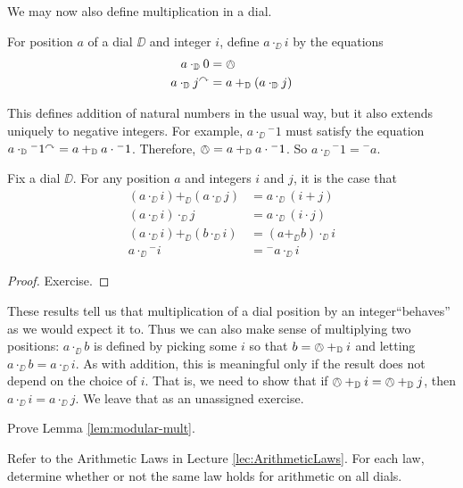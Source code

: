 We may now also define multiplication in a dial.

\begin{defn}
	For position $a$ of a dial $\DD$ and integer $i$, define $a\cdot_\DD i$ by the equations
	\begin{align*}
		a\cdot_{\mathbb D}  0 &= \owedge\\
		a\cdot_{\mathbb D} j^\curvearrowright &= a +_{\mathbb D} (a\cdot_{\mathbb D} j)
	\end{align*}
	
	This defines addition of natural numbers in the usual way, but it also extends uniquely to negative integers. For example, $a \cdot_\DD {}^-1$ must satisfy the equation $a\cdot_{\mathbb D} {}^-1^\curvearrowright = a +_{\mathbb D} a\cdot {}^-1$.
	Therefore, $\owedge = a +_{\mathbb D} a\cdot {}^-1$. So $a\cdot_\DD {}^-1 = {}^- a$.
\end{defn}


\begin{lem}\label{lem:modular-mult}
	Fix a dial $\DD$. For any position $a$ and integers $i$ and $j$, it is the case that 
	\begin{align*} 
		(a \cdot_\DD i)+_\DD (a\cdot_\DD j) &= a\cdot_\DD (i+j)\\
		(a\cdot_\DD i)\cdot_\DD j &= a\cdot_\DD (i\cdot j)\\
		(a\cdot_\DD i) +_\DD (b\cdot_\DD i) &= (a+_\DD b)\cdot_\DD i\\
		a\cdot_\DD{}^-i &= {}^-a \cdot_\DD i
	\end{align*}

\begin{proof}
	Exercise.
\end{proof}
\end{lem}

These results tell us that multiplication of a dial position by an integer``behaves'' as we would expect it to. Thus we can also make sense of multiplying two positions: $a \cdot_\DD b$ is defined by picking some $i$ so that $b = \owedge +_{\mathbb D} i$ and letting $a\cdot_\DD b = a\cdot_\DD i$. As with addition, this is meaningful only if the result does not depend on the choice of $i$. That is, we need to show that if $\owedge +_{\mathbb D} i = \owedge +_{\mathbb D} j$, then $a\cdot_\DD i = a\cdot_\DD j$. We leave that as an unassigned exercise.

\begin{exer}
	\begin{exercise}
		\item Prove Lemma \ref{lem:modular-mult}.
		\item Refer to the Arithmetic Laws in Lecture \ref{lec:ArithmeticLaws}. For each law, determine whether or not the same law holds for arithmetic on all dials.
	\end{exercise}
\end{exer}


